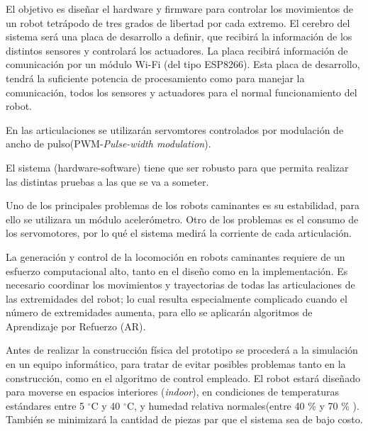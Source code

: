 \documentclass[
11pt, %
codirector, %
]{charter}
\begin{document}



El objetivo es diseñar el hardware y firmware para controlar los movimientos de un robot tetrápodo de tres grados de libertad por cada extremo. El cerebro del sistema será una placa de desarrollo a definir, que recibirá la información de los distintos sensores y controlará los actuadores. La placa recibirá información de comunicación por un módulo Wi-Fi (del tipo ESP8266).
Esta placa de desarrollo, tendrá la suficiente potencia de procesamiento como para manejar la comunicación, todos los sensores y actuadores para el normal funcionamiento del robot. 

En las articulaciones se utilizarán servomtores controlados por modulación de ancho de pulso(PWM-\textit{Pulse-width modulation}). 

El sistema (hardware-software) tiene que ser robusto para que permita realizar las distintas pruebas a las que se va a someter.

Uno de los principales problemas de los robots caminantes es su estabilidad, para ello se utilizara un módulo acelerómetro. Otro de los problemas es el consumo de los servomotores, por lo qué el sistema medirá la corriente de cada articulación.   

La generación y control de la locomoción en robots caminantes requiere de un esfuerzo computacional alto, tanto en el diseño como en la implementación. Es necesario coordinar los movimientos y trayectorias de todas las articulaciones de las extremidades del robot; lo cual resulta especialmente complicado cuando el número de extremidades aumenta, para ello se aplicarán algoritmos de Aprendizaje por Refuerzo (AR).

Antes de realizar la construcción física del prototipo se procederá a la simulación en un equipo informático, para tratar de evitar posibles problemas tanto en la construcción, como en el algoritmo de control empleado. 
El robot estará diseñado para moverse en espacios interiores (\textit{indoor}), en condiciones de temperaturas estándares entre 5 $^\circ$C y 40 $^\circ$C, y humedad relativa normales(entre 40 \% y 70 \% ).
También se minimizará la cantidad de piezas par que el sistema sea de bajo costo.  
\end{document}
